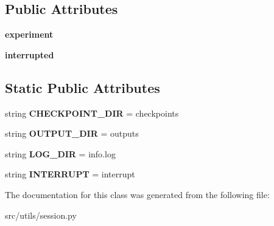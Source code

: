 \subsection*{Public Attributes}
\begin{DoxyCompactItemize}
\item 
{\bfseries experiment}\hypertarget{classsession_1_1Session_ad177e7e2c494fb6a155aff9c4f710398}{}\label{classsession_1_1Session_ad177e7e2c494fb6a155aff9c4f710398}

\item 
{\bfseries interrupted}\hypertarget{classsession_1_1Session_af8af8859050a7d59d3cacd49f1a2dfd3}{}\label{classsession_1_1Session_af8af8859050a7d59d3cacd49f1a2dfd3}

\end{DoxyCompactItemize}
\subsection*{Static Public Attributes}
\begin{DoxyCompactItemize}
\item 
string {\bfseries C\+H\+E\+C\+K\+P\+O\+I\+N\+T\+\_\+\+D\+IR} = \textquotesingle{}checkpoints\textquotesingle{}\hypertarget{classsession_1_1Session_a74e38451a130d4ccaad3311b4870dade}{}\label{classsession_1_1Session_a74e38451a130d4ccaad3311b4870dade}

\item 
string {\bfseries O\+U\+T\+P\+U\+T\+\_\+\+D\+IR} = \textquotesingle{}outputs\textquotesingle{}\hypertarget{classsession_1_1Session_aa3fae0c3d458f3645cefa6f380d10dc5}{}\label{classsession_1_1Session_aa3fae0c3d458f3645cefa6f380d10dc5}

\item 
string {\bfseries L\+O\+G\+\_\+\+D\+IR} = \textquotesingle{}info.\+log\textquotesingle{}\hypertarget{classsession_1_1Session_a92db41a3bab4520757248e7306d8face}{}\label{classsession_1_1Session_a92db41a3bab4520757248e7306d8face}

\item 
string {\bfseries I\+N\+T\+E\+R\+R\+U\+PT} = \textquotesingle{}interrupt\textquotesingle{}\hypertarget{classsession_1_1Session_a2eca9606f45c37fb4cee5e0645eb8043}{}\label{classsession_1_1Session_a2eca9606f45c37fb4cee5e0645eb8043}

\end{DoxyCompactItemize}


The documentation for this class was generated from the following file\+:\begin{DoxyCompactItemize}
\item 
src/utils/session.\+py\end{DoxyCompactItemize}
